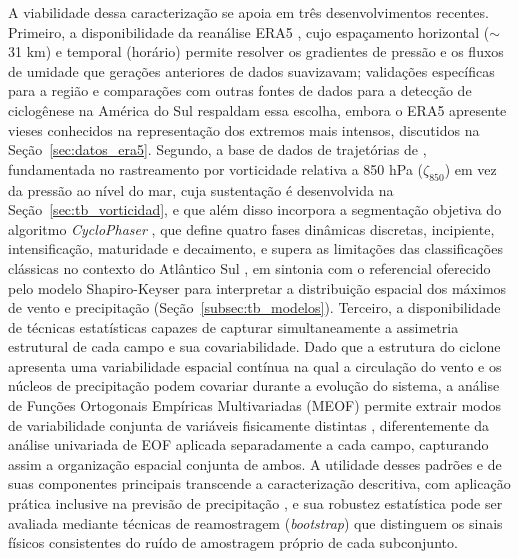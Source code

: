 A viabilidade dessa caracterização se apoia em três desenvolvimentos recentes.
Primeiro, a disponibilidade da reanálise ERA5 \citep{hersbach2020era5}, cujo espaçamento horizontal ($\sim$31 km) e temporal (horário) permite resolver os gradientes de pressão e os fluxos de umidade que gerações anteriores de dados suavizavam; validações específicas para a região \citep{gramcianinov2020analysis} e comparações com outras fontes de dados para a detecção de ciclogênese na América do Sul \citep{dalanhese2023new} respaldam essa escolha, embora o ERA5 apresente vieses conhecidos na representação dos extremos mais intensos, discutidos na Seção~\ref{sec:datos_era5}.
Segundo, a base de dados de trajetórias de \citet{gramcianinov2020analysis}, fundamentada no rastreamento por vorticidade relativa a 850 hPa ($\zeta_{850}$) em vez da pressão ao nível do mar, cuja sustentação é desenvolvida na Seção~\ref{sec:tb_vorticidad}, e que além disso incorpora a segmentação objetiva do algoritmo \textit{CycloPhaser} \citep{coutodesouza2024new, deSouza2025CycloPhaser}, que define quatro fases dinâmicas discretas, incipiente, intensificação, maturidade e decaimento, e supera as limitações das classificações clássicas no contexto do Atlântico Sul \citep{deSouza2025CycloPhaser}, em sintonia com o referencial oferecido pelo modelo Shapiro-Keyser \citep{shapiro1990life,shapiro1999bridge} para interpretar a distribuição espacial dos máximos de vento e precipitação (Seção~\ref{subsec:tb_modelos}).
Terceiro, a disponibilidade de técnicas estatísticas capazes de capturar simultaneamente a assimetria estrutural de cada campo e sua covariabilidade.
Dado que a estrutura do ciclone apresenta uma variabilidade espacial contínua na qual a circulação do vento e os núcleos de precipitação podem covariar durante a evolução do sistema, a análise de Funções Ortogonais Empíricas Multivariadas (MEOF) permite extrair modos de variabilidade conjunta de variáveis fisicamente distintas \citep{liang2018multivariate}, diferentemente da análise univariada de EOF aplicada separadamente a cada campo, capturando assim a organização espacial conjunta de ambos.
A utilidade desses padrões e de suas componentes principais transcende a caracterização descritiva, com aplicação prática inclusive na previsão de precipitação \citep{sun2022evaluation}, e sua robustez estatística pode ser avaliada mediante técnicas de reamostragem (\textit{bootstrap}) que distinguem os sinais físicos consistentes do ruído de amostragem próprio de cada subconjunto.


